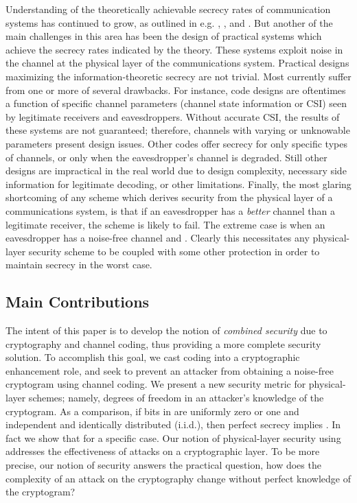 \documentclass[10pt,twocolumn,twoside]{IEEEtran} \newlength{\pic}
\theoremstyle{definition}
\theoremstyle{remark}
\theoremstyle{plain}
\begin{document}
Understanding of the theoretically achievable secrecy rates of communication systems has continued to grow, as outlined in e.g. \cite{Wyner84}, \cite{Bloch06}, and \cite{Maurer00}. But another of the main challenges in this area has been the design of practical systems which achieve the secrecy rates indicated by the theory. These systems exploit noise in the channel at the physical layer of the communications system. Practical designs maximizing the information-theoretic secrecy are not trivial. Most currently suffer from one or more of several drawbacks. For instance, code designs are oftentimes a function of specific channel parameters (channel state information or CSI) seen by legitimate receivers and eavesdroppers.  Without accurate CSI, the results of these systems are not guaranteed; therefore, channels with varying or unknowable parameters present design issues. Other codes offer secrecy for only specific types of channels, or only when the eavesdropper's channel is degraded. Still other designs are impractical in the real world due to design complexity, necessary side information for legitimate decoding, or other limitations. Finally, the most glaring shortcoming of any scheme which derives security from the physical layer of a communications system, is that if an eavesdropper has a \emph{better} channel than a legitimate receiver, the scheme is likely to fail. The extreme case is when an eavesdropper has a noise-free channel and . Clearly this necessitates any physical-layer security scheme to be coupled with some other protection in order to maintain secrecy in the worst case.

\subsection{Main Contributions}

The intent of this paper is to develop the notion of \emph{combined security} due to cryptography and channel coding, thus providing a more complete security solution. To accomplish this goal, we cast coding into a cryptographic enhancement role, and seek to prevent an attacker from obtaining a noise-free cryptogram using channel coding. We present a new security metric for physical-layer schemes; namely, degrees of freedom  in an attacker's knowledge of the cryptogram. As a comparison, if bits in  are uniformly zero or one and independent and identically distributed (i.i.d.), then perfect secrecy implies . In fact we show that  for a specific case. Our notion of physical-layer security using  addresses the effectiveness of attacks on a cryptographic layer. To be more precise, our notion of security answers the practical question, how does the complexity of an attack on the cryptography change without perfect knowledge of the cryptogram?
\end{document}
